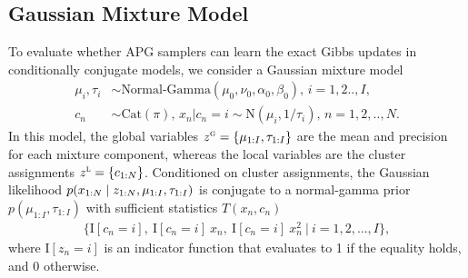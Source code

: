\documentclass{article}
\theoremstyle{definition}
\begin{document}
\subsection{Gaussian Mixture Model}
\label{sec:gmm}
\vspace{-0.5em}
To evaluate whether APG samplers can learn the exact Gibbs updates in conditionally conjugate models, we consider a Gaussian mixture model 
\begin{align*}
    \mu_i, \tau_i &\sim \text{Normal-Gamma}(\mu_0, \nu_0, \alpha_0, \beta_0)
    , \,
    i =1,2..,I, \\
    c_n &\sim \mathrm{Cat}(\pi), \,
    x_n | c_n\!=\!i \sim \text{N}(\mu_i, 1 / \tau_i)
    , \,
    n =1,2,..,N.
\end{align*}
In this model, the global variables $z^\textsc{g} = \{\mu_{1:I}, \tau_{1:I}\}$ are the mean and precision for each mixture component, whereas the local variables are the cluster assignments $z^\textsc{l} = \{c_{1:N}\}$. Conditioned on cluster assignments, the Gaussian likelihood $p(x_{1:N} \mid z_{1:N}, \mu_{1:I}, \tau_{1:I})$ is conjugate to a normal-gamma prior $p(\mu_{1:I}, \tau_{1:I})$ with sufficient statistics $T(x_n, c_n)$ 
\begin{align*}
    \Big\{\mathrm{I}[c_n \!=\! i], 
        ~\mathrm{I}[c_n \!=\! i] \: x_n, 
        ~\mathrm{I}[c_n \!=\! i] \: x_n^2 
        ~\Big\vert~ i \!=\! 1,2,\dots,I 
    \Big\}
    ,
\end{align*}
where $\mathrm{I}[z_n \!=\! i]$ is an indicator function that evaluates to 1 if the equality holds, and 0 otherwise.
\end{document}
